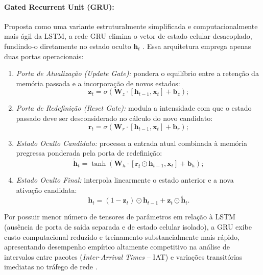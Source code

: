\paragraph{Gated Recurrent Unit (GRU):}
Proposta como uma variante estruturalmente simplificada e computacionalmente mais ágil da LSTM, a rede GRU elimina o vetor de estado celular desacoplado, fundindo-o diretamente no estado oculto $\mathbf{h}_t$ \cite{survey2025dl, timematters2025}. Essa arquitetura emprega apenas duas portas operacionais:

\begin{enumerate}
    \item \emph{Porta de Atualização (\emph{Update Gate}):} pondera o equilíbrio entre a retenção da memória passada e a incorporação de novos estados:
    \begin{equation}
    \label{eq:gru_update}
    \mathbf{z}_t = \sigma \left( \mathbf{W}_z \cdot [\mathbf{h}_{t-1}, \mathbf{x}_t] + \mathbf{b}_z \right);
    \end{equation}
    \item \emph{Porta de Redefinição (\emph{Reset Gate}):} modula a intensidade com que o estado passado deve ser desconsiderado no cálculo do novo candidato:
    \begin{equation}
    \label{eq:gru_reset}
    \mathbf{r}_t = \sigma \left( \mathbf{W}_r \cdot [\mathbf{h}_{t-1}, \mathbf{x}_t] + \mathbf{b}_r \right);
    \end{equation}
    \item \emph{Estado Oculto Candidato:} processa a entrada atual combinada à memória pregressa ponderada pela porta de redefinição:
    \begin{equation}
    \label{eq:gru_candidate}
    \tilde{\mathbf{h}}_t = \tanh \left( \mathbf{W}_h \cdot [\mathbf{r}_t \odot \mathbf{h}_{t-1}, \mathbf{x}_t] + \mathbf{b}_h \right);
    \end{equation}
    \item \emph{Estado Oculto Final:} interpola linearmente o estado anterior e a nova ativação candidata:
    \begin{equation}
    \label{eq:gru_hidden}
    \mathbf{h}_t = (1 - \mathbf{z}_t) \odot \mathbf{h}_{t-1} + \mathbf{z}_t \odot \tilde{\mathbf{h}}_t.
    \end{equation}
\end{enumerate}

Por possuir menor número de tensores de parâmetros em relação à LSTM (ausência de porta de saída separada e de estado celular isolado), a GRU exibe custo computacional reduzido e treinamento substancialmente mais rápido, apresentando desempenho empírico altamente competitivo na análise de intervalos entre pacotes (\emph{Inter-Arrival Times} -- IAT) e variações transitórias imediatas no tráfego de rede \cite{timematters2025}.

